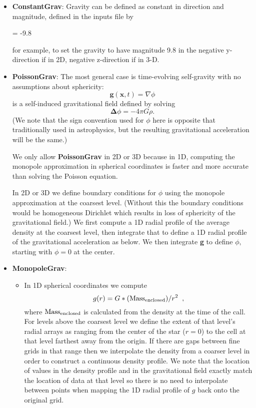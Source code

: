 \begin{itemize}
\item {\bf ConstantGrav}: Gravity can be defined as constant in direction and magnitude, 
defined in the inputs file by 

 = -9.8

for example, to set the gravity to have magnitude 9.8 in the 
negative y-direction if in 2D, negative z-direction if in 3-D.

\item {\bf PoissonGrav}: 
The most general case is time-evolving self-gravity with no assumptions about sphericity:
\begin{equation}
\mathbf{g}(\mathbf{x},t) = \nabla \phi 
\end{equation}
is a self-induced gravitational field defined by solving
\begin{equation}
\mathbf{\Delta} \phi = -4 \pi G \rho .\label{eq:Self Gravity}
\end{equation}
(We note that the sign convention used for $\phi$ here is opposite
that traditionally used in astrophysics, but the resulting
gravitational acceleration will be the same.)

We only allow {\bf PoissonGrav} in 2D or 3D because in 1D, computing the monopole 
approximation in spherical coordinates is faster and more accurate than solving
the Poisson equation.

In 2D or 3D we define boundary conditions for $\phi$ using the monopole approximation
at the coarsest level.  (Without this the boundary conditions would be homogeneous
Dirichlet which results in loss of sphericity of the gravitational field.)  We first
compute a 1D radial profile of the average density at the coarsest level, then integrate
that to define a 1D radial profile of the gravitational acceleration as below.  We
then integrate {\bf g} to define $\phi,$ starting with $\phi = 0$ at the center.

\item {\bf MonopoleGrav}: 
\begin{itemize}

\item In 1D spherical coordinates we compute 
\[g(r) = G * ({\rm Mass_{enclosed}}) / r^2 \; \; , \]
where ${\rm Mass_{enclosed}}$ is calculated from the density at the time of the call. 
For levels above the coarsest level we define the extent of that level's radial arrays 
as ranging from the center of the star ($r=0$) to the cell at that level farthest away from the
origin.  If there are gaps between fine grids in that range then we interpolate the density
from a coarser level in order to construct a continuous density profile.  We note that
the location of values in the density profile and in the gravitational field exactly match the
location of data at that level so there is no need to interpolate between points when
mapping the 1D radial profile of $g$ back onto the original grid.


\end{itemize}
\end{itemize}
